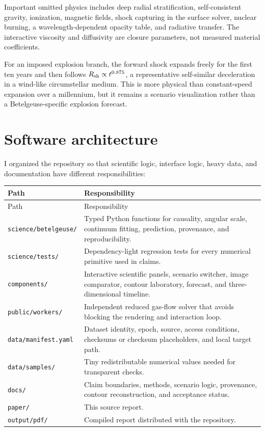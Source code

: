 \documentclass[11pt,a4paper]{article}
\begin{document}
Important omitted physics includes deep radial stratification, self-consistent gravity, ionization, magnetic fields, shock capturing in the surface solver, nuclear burning, a wavelength-dependent opacity table, and radiative transfer. The interactive viscosity and diffusivity are closure parameters, not measured material coefficients.

For an imposed explosion branch, the forward shock expands freely for the first ten years and then follows $R_{\rm sh}\propto t^{0.875}$, a representative self-similar deceleration in a wind-like circumstellar medium. This is more physical than constant-speed expansion over a millennium, but it remains a scenario visualization rather than a Betelgeuse-specific explosion forecast.

\section{Software architecture}

I organized the repository so that scientific logic, interface logic, heavy data, and documentation have different responsibilities:

\begin{longtable}{@{}p{}p{}@{}}
\toprule
Path & Responsibility \\
\midrule
\endfirsthead
\toprule
Path & Responsibility \\
\midrule
\endhead
\texttt{science/betelgeuse/} & Typed Python functions for causality, angular scale, continuum fitting, prediction, provenance, and reproducibility. \\
\texttt{science/tests/} & Dependency-light regression tests for every numerical primitive used in claims. \\
\texttt{components/} & Interactive scientific panels, scenario switcher, image comparator, contour laboratory, forecast, and three-dimensional timeline. \\
\texttt{public/workers/} & Independent reduced gas-flow solver that avoids blocking the rendering and interaction loop. \\
\texttt{data/manifest.yaml} & Dataset identity, epoch, source, access conditions, checksums or checksum placeholders, and local target path. \\
\texttt{data/samples/} & Tiny redistributable numerical values needed for transparent checks. \\
\texttt{docs/} & Claim boundaries, methods, scenario logic, provenance, contour reconstruction, and acceptance status. \\
\texttt{paper/} & This source report. \\
\texttt{output/pdf/} & Compiled report distributed with the repository. \\
\bottomrule
\end{longtable}
\end{document}
